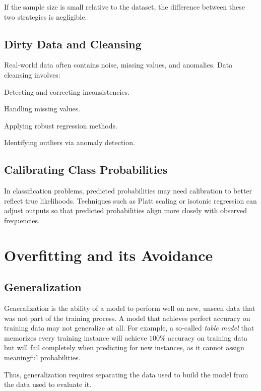     If the sample size is small relative to the dataset, the difference between these two strategies is negligible.
    
    \subsection{Dirty Data and Cleansing}
    Real-world data often contains noise, missing values, and anomalies. Data cleansing involves:
    \begin{compactitemize}
        \item Detecting and correcting inconsistencies.
        \item Handling missing values.
        \item Applying robust regression methods.
        \item Identifying outliers via anomaly detection.
    \end{compactitemize}
    
    \subsection{Calibrating Class Probabilities}
    In classification problems, predicted probabilities may need calibration to better reflect true likelihoods. Techniques such as Platt scaling or isotonic regression can adjust outputs so that predicted probabilities align more closely with observed frequencies.

\section{Overfitting and its Avoidance}
\subsection{Generalization}
Generalization is the ability of a model to perform well on new, unseen data that was not part of the training process. A model that achieves perfect accuracy on training data may not generalize at all. For example, a so-called \textit{table model} that memorizes every training instance will achieve $100\%$ accuracy on training data but will fail completely when predicting for new instances, as it cannot assign meaningful probabilities.


Thus, generalization requires separating the data used to build the model from the data used to evaluate it.


